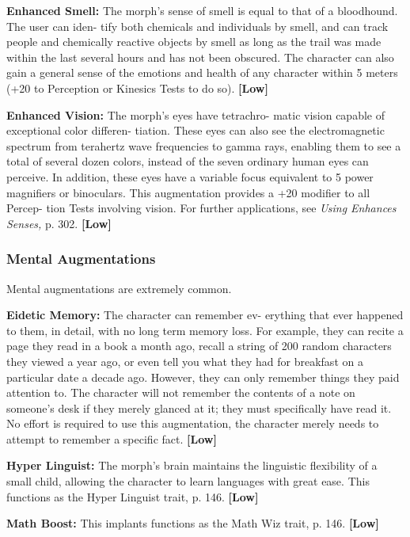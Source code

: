 \textbf{Enhanced Smell:} The morph's sense of smell is 
equal to that of a bloodhound. The user can iden-
tify both chemicals and individuals by smell, and can 
track people and chemically reactive objects by smell 
as long as the trail was made within the last several 
hours and has not been obscured. The character can 
also gain a general sense of the emotions and health 
of any character within 5 meters (+20 to Perception or 
Kinesics Tests to do so). \textbf{[Low]}

\textbf{Enhanced Vision:} The morph's eyes have tetrachro-
matic vision capable of exceptional color differen-
tiation. These eyes can also see the electromagnetic 
spectrum from terahertz wave frequencies to gamma 
rays, enabling them to see a total of several dozen 
colors, instead of the seven ordinary human eyes can 
perceive. In addition, these eyes have a variable focus 
equivalent to 5 power magnifiers or binoculars. This 
augmentation provides a +20 modifier to all Percep-
tion Tests involving vision. For further applications, 
see \textit{Using Enhances Senses,} p. 302. \textbf{[Low]}

\subsubsection{Mental Augmentations}

Mental augmentations are extremely common.

\textbf{Eidetic Memory:} The character can remember ev-
erything that ever happened to them, in detail, with 
no long term memory loss. For example, they can 
recite a page they read in a book a month ago, recall 
a string of 200 random characters they viewed a year 
ago, or even tell you what they had for breakfast on 
a particular date a decade ago. However, they can 
only remember things they paid attention to. The 
character will not remember the contents of a note 
on someone's desk if they merely glanced at it; they 
must specifically have read it. No effort is required to 
use this augmentation, the character merely needs to 
attempt to remember a specific fact. \textbf{[Low]}

\textbf{Hyper Linguist: }The morph's brain maintains the 
linguistic flexibility of a small child, allowing the 
character to learn languages with great ease. This 
functions as the Hyper Linguist trait, p. 146. \textbf{[Low]}

\textbf{Math Boost:} This implants functions as the Math 
Wiz trait, p. 146. \textbf{[Low]}

